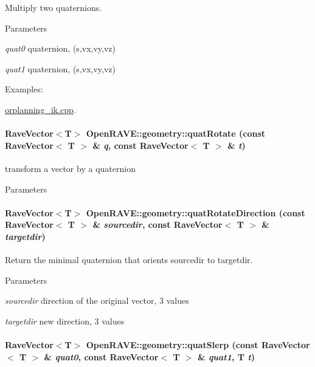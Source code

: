 Multiply two quaternions. 


\begin{DoxyParams}{Parameters}
\item[{\em quat0}]quaternion, (s,vx,vy,vz) \item[{\em quat1}]quaternion, (s,vx,vy,vz) \end{DoxyParams}
\begin{Desc}
\item[Examples: ]\par
\hyperlink{orplanning__ik_8cpp-example}{orplanning\_\-ik.cpp}.\end{Desc}
\hypertarget{group__affine__math_ga53ddf2e9014f577a6915e180a3cf01e1}{
\paragraph[{quatRotate}]{\setlength{\rightskip}{0pt plus 5cm}RaveVector$<$T$>$ OpenRAVE::geometry::quatRotate (const RaveVector$<$ T $>$ \& {\em q}, \/  const RaveVector$<$ T $>$ \& {\em t})}\hfill}
\label{group__affine__math_ga53ddf2e9014f577a6915e180a3cf01e1}


transform a vector by a quaternion 


\begin{DoxyParams}{Parameters}
\item[{\em }]\end{DoxyParams}
\hypertarget{group__affine__math_gaa6b1411c303ea16ecb279ae4a08735c0}{
\paragraph[{quatRotateDirection}]{\setlength{\rightskip}{0pt plus 5cm}RaveVector$<$T$>$ OpenRAVE::geometry::quatRotateDirection (const RaveVector$<$ T $>$ \& {\em sourcedir}, \/  const RaveVector$<$ T $>$ \& {\em targetdir})}\hfill}
\label{group__affine__math_gaa6b1411c303ea16ecb279ae4a08735c0}


Return the minimal quaternion that orients sourcedir to targetdir. 


\begin{DoxyParams}{Parameters}
\item[{\em sourcedir}]direction of the original vector, 3 values \item[{\em targetdir}]new direction, 3 values \end{DoxyParams}
\hypertarget{group__affine__math_gab1abf41daa0f130493c4a0591b03b4ec}{
\paragraph[{quatSlerp}]{\setlength{\rightskip}{0pt plus 5cm}RaveVector$<$T$>$ OpenRAVE::geometry::quatSlerp (const RaveVector$<$ T $>$ \& {\em quat0}, \/  const RaveVector$<$ T $>$ \& {\em quat1}, \/  T {\em t})}\hfill}
\label{group__affine__math_gab1abf41daa0f130493c4a0591b03b4ec}


